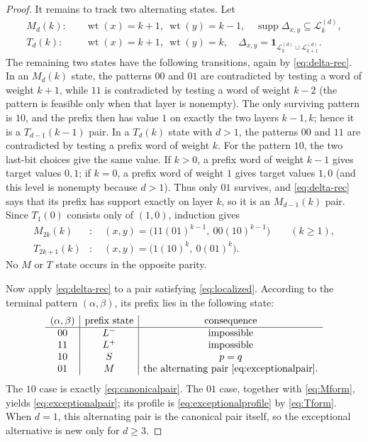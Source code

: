 \documentclass[11pt]{article}
\theoremstyle{definition}
\newcommand{\wt}{\operatorname{wt}}
\newcommand{\supp}{\operatorname{supp}}
\newcommand{\cL}{\mathcal L}
\begin{document}
\begin{proof}
It remains to track two alternating states.  Let
\begin{align*}
 M_d(k):&\quad \wt(x)=k+1,\ \wt(y)=k-1,
     \quad\supp\Delta_{x,y}\subseteq\cL_k^{(d)},\\
 T_d(k):&\quad \wt(x)=k+1,\ \wt(y)=k,
     \quad\Delta_{x,y}=\mathbf 1_{\cL_k^{(d)}\cup\cL_{k+1}^{(d)}}.
\end{align*}
The remaining two states have the following transitions, again by \eqref{eq:delta-rec}.  In an $M_d(k)$ state, the patterns $00$ and $01$ are contradicted by testing a word of weight $k+1$, while $11$ is contradicted by testing a word of weight $k-2$ (the pattern is feasible only when that layer is nonempty).  The only surviving pattern is $10$, and the prefix then has value $1$ on exactly the two layers $k-1,k$; hence it is a $T_{d-1}(k-1)$ pair.  In a $T_d(k)$ state with $d>1$, the patterns $00$ and $11$ are contradicted by testing a prefix word of weight $k$.  For the pattern $10$, the two last-bit choices give the same value.  If $k>0$, a prefix word of weight $k-1$ gives target values $0,1$; if $k=0$, a prefix word of weight $1$ gives target values $1,0$ (and this level is nonempty because $d>1$).  Thus only $01$ survives, and \eqref{eq:delta-rec} says that its prefix has support exactly on layer $k$, so it is an $M_{d-1}(k)$ pair.  Since $T_1(0)$ consists only of $(1,0)$, induction gives
\begin{align}
 M_{2k}(k)&:\quad
 (x,y)=\bigl(11(01)^{k-1},\ 00(10)^{k-1}\bigr)\qquad(k\ge1),\label{eq:Mform}\\
 T_{2k+1}(k)&:\quad
 (x,y)=\bigl(1(10)^k,\ 0(01)^k\bigr).\label{eq:Tform}
\end{align}
No $M$ or $T$ state occurs in the opposite parity.

Now apply \eqref{eq:delta-rec} to a pair satisfying \eqref{eq:localized}.  According to the terminal pattern $(\alpha,\beta)$, its prefix lies in the following state:
\[
\begin{array}{c|c|c}
(\alpha,\beta)&\text{prefix state}&\text{consequence}\\ \hline
00&L^-&\text{impossible}\\
11&L^+&\text{impossible}\\
10&S&p=q\\
01&M&\text{the alternating pair \eqref{eq:exceptionalpair}.}
\end{array}
\]
The $10$ case is exactly \eqref{eq:canonicalpair}.  The $01$ case, together with \eqref{eq:Mform}, yields \eqref{eq:exceptionalpair}; its profile is \eqref{eq:exceptionalprofile} by \eqref{eq:Tform}.  When $d=1$, this alternating pair is the canonical pair itself, so the exceptional alternative is new only for $d\ge3$.
\end{proof}
\end{document}
